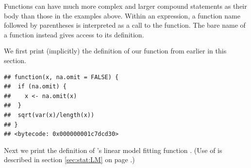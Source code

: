 \documentclass[krantz2]{krantz}\usepackage{knitr}
\begin{document}
Functions can have much more complex and larger compound statements as their body than those in the examples above. Within an expression, a function name followed by parentheses is interpreted as a call to the function. The bare name of a function instead gives access to its definition.

We first print (implicitly) the definition of our function from earlier in this section.

\begin{knitrout}\footnotesize
{}\color{fgcolor}\begin{kframe}
\begin{alltt}
\end{alltt}
\begin{verbatim}
## function(x, na.omit = FALSE) {
##  if (na.omit) {
##    x <- na.omit(x)
##  }
##  sqrt(var(x)/length(x))
## }
## <bytecode: 0x000000001c7dcd30>
\end{verbatim}
\end{kframe}
\end{knitrout}

Next we print the definition of \Rlang's linear model fitting function . (Use of  is described in section \ref{sec:stat:LM} on page \pageref{sec:stat:LM}.)
\end{document}
